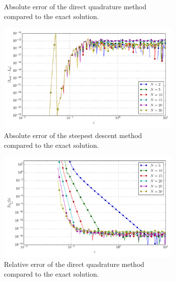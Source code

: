 \documentclass[a4paper,10pt]{article}
\begin{document}
\begin{figure}[ht!]
\begin{subfigure}[t]{0.5\linewidth}
    \caption{Absolute error of the direct quadrature method compared to the exact solution.}
    \label{fig:tp_2d_conv_eps_00_00_err_qr}
  \end{subfigure}
  \begin{subfigure}[t]{0.5\linewidth}
    \includegraphics[width=\linewidth]{./plots/tp_2d_conv_eps_(0,0)_(0,0)_err_nsd.pdf}
    \caption{Absolute error of the steepest descent method compared to the exact solution.}
    \label{fig:tp_2d_conv_eps_00_00_err_nsd}
  \end{subfigure}
  \begin{subfigure}[t]{0.5\linewidth}
    \includegraphics[width=\linewidth]{./plots/tp_2d_conv_eps_(0,0)_(0,0)_err_rel_qr.pdf}
    \caption{Relative error of the direct quadrature method compared to the exact solution.}
    \label{fig:tp_2d_conv_eps_00_00_err_rel_qr}
  \end{subfigure}
  \begin{subfigure}[t]{0.5\linewidth}

\end{subfigure}
\end{figure}
\end{document}
